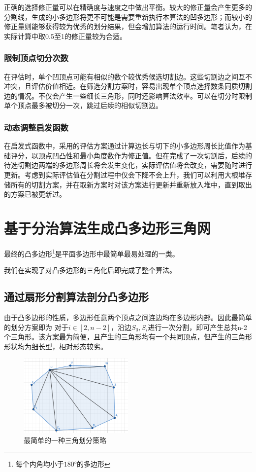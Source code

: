 正确的选择修正量可以在精确度与速度之中做出平衡。较大的修正量会产生更多的分割线，生成的小多边形将更不可能是需要重新执行本算法的凹多边形；而较小的修正量则能够获得较为优秀的划分结果，但会增加算法的运行时间。笔者认为，在实际计算中取0.5至1的修正量较为合适。

\subsubsection{限制顶点切分次数}
在评估时，单个凹顶点可能有相似的数个较优秀候选切割边。这些切割边之间互不冲突，且评估价值相近。在筛选分割方案时，容易出现单个顶点选择数条同质切割边的情况。不仅会产生一些细长三角形，同时还影响算法效率。可以在切分时限制单个顶点最多被切分一次，跳过后续的相似切割边。
\subsubsection{动态调整启发函数}
在启发式函数中，采用的评估方案通过计算边长与切下的小多边形周长比值作为基础评分，以顶点凹凸性和最小角度数作为修正值。但在完成了一次切割后，后续的待选切割边两端的多边形周长将会发生变化，实际评估值将会改变，需要随时进行更新。考虑到实际评估值在分割过程中仅会下降不会上升，我们可以利用大根堆存储所有的切割方案，并在取新方案时对该方案进行更新并重新放入堆中，直到取出的方案已被更新过。

\section{基于分治算法生成凸多边形三角网}\label{sec:对凸多边形进行三角化}

最终的凸多边形\footnote{每个内角均小于\(180°\)的多边形}是平面多边形中最简单最易处理的一类。

我们在实现了对凸多边形的三角化后即完成了整个算法。

\subsection{通过扇形分割算法剖分凸多边形}

由于凸多边形的性质，多边形任意两个顶点之间连边均在多边形内部。因此最简单的划分方案即为 对于\(i\in [2,n-2]\)，沿边\(S_0,S_i\)进行一次分割，即可产生总共n-2个三角形。该方案最为简便，且产生的三角形均有一个共同顶点，但产生的三角形形状均为细长型，相对形态较劣。
\begin{figure}[htp]
    \centering
    \includegraphics[width=0.5\textwidth]
    {figures/凸多边形1.png}
    \caption{最简单的一种三角划分策略}
  \end{figure}

